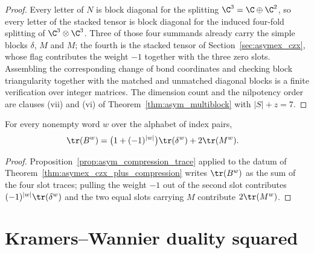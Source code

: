 \begin{proof}
    \leanok
    Every letter of $N$ is block diagonal for the splitting
    $\C^3=\C\oplus\C^2$, so every letter of the stacked tensor is block
    diagonal for the induced four-fold splitting of $\C^3\otimes\C^3$.
    Three of those four summands already carry the simple blocks $\delta$,
    $M$ and $M$; the fourth is the stacked tensor of
    Section~\ref{sec:asymex_czx}, whose flag contributes the weight $-1$
    together with the three zero slots. Assembling the corresponding change
    of bond coordinates and checking block triangularity together with the
    matched and unmatched diagonal blocks is a finite verification over
    integer matrices. The dimension count and the nilpotency order are
    clauses (vii) and (vi) of Theorem~\ref{thm:asym_multiblock} with
    $|S|+z=7$.
\end{proof}

\begin{theorem}
    \label{thm:asymex_czx_plus_trace}
    \leanok
    For every nonempty word $w$ over the alphabet of index pairs,
    \begin{align}
        \tr(B^w) & =\bigl(1+(-1)^{|w|}\bigr)\tr(\delta^w)+2\tr(M^w).
        \label{eq:asymex_czx_plus_trace}
    \end{align}
\end{theorem}

\begin{proof}
    \leanok
    Proposition~\ref{prop:asym_compression_trace} applied to the datum of
    Theorem~\ref{thm:asymex_czx_plus_compression} writes $\tr(B^w)$ as the
    sum of the four slot traces; pulling the weight $-1$ out of the second
    slot contributes $(-1)^{|w|}\tr(\delta^w)$ and the two equal slots
    carrying $M$ contribute $2\tr(M^w)$.
\end{proof}

\section{Kramers--Wannier duality squared}%
\label{sec:asymex_kw}

